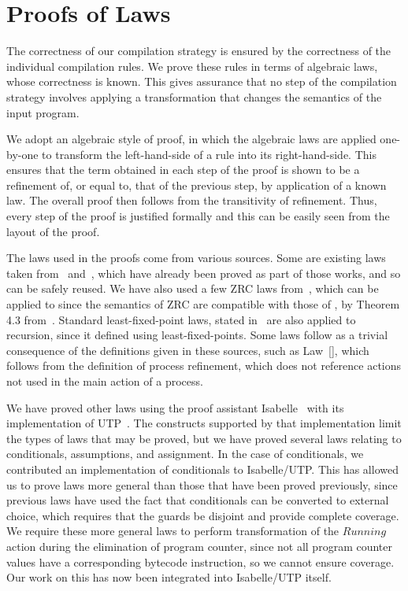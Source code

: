 \section{Proofs of Laws}
\label{proofs-of-laws-section}

The correctness of our compilation strategy is ensured by the
correctness of the individual compilation rules.
We prove these rules in terms of algebraic laws, whose correctness is
known.
This gives assurance that no step of the compilation strategy involves
applying a transformation that changes the semantics of the input
program.

We adopt an algebraic style of proof, in which the algebraic laws are
applied one-by-one to transform the left-hand-side of a rule into its
right-hand-side.
This ensures that the term obtained in each step of the proof is shown
to be a refinement of, or equal to, that of the previous step, by
application of a known law.
The overall proof then follows from the transitivity of refinement.
Thus, every step of the proof is justified formally and this can be
easily seen from the layout of the proof.

The laws used in the proofs come from various sources.
Some are existing laws taken from~\cite{oliveira2006}
and~\cite{miyazawa2012}, which have already been proved as part of
those works, and so can be safely reused.
We have also used a few ZRC laws from~\cite{cavalcanti1998}, which can
be applied to \Circus{} since the semantics of ZRC are compatible with
those of \Circus{}, by Theorem 4.3 from~\cite{oliveira2006}.
Standard least-fixed-point laws, stated in~\cite{hoare1998} are also
applied to \Circus{} recursion, since it defined using
least-fixed-points.
Some laws follow as a trivial consequence of the definitions given in
these sources, such as Law~[], which follows
from the definition of process refinement, which does not reference
actions not used in the main action of a process.

We have proved other laws using the proof assistant
Isabelle~\cite{nipkow2002} with its implementation of
UTP~\cite{foster2015}.
The constructs supported by that implementation limit the types of
laws that may be proved, but we have proved several laws relating to
conditionals, assumptions, and assignment.
In the case of conditionals, we contributed an implementation of
\Circus{} conditionals to Isabelle/UTP.
This has allowed us to prove laws more general than those that have
been proved previously, since previous laws have used the fact that
conditionals can be converted to external choice, which requires that
the guards be disjoint and provide complete coverage.
We require these more general laws to perform transformation of the
$Running$ action during the elimination of program counter, since not
all program counter values have a corresponding bytecode instruction,
so we cannot ensure coverage.
Our work on this has now been integrated into Isabelle/UTP itself.

